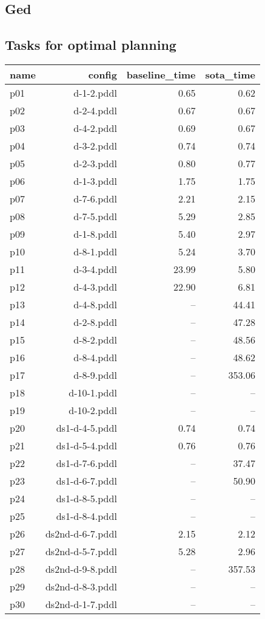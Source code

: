 \documentclass{article}
\begin{document}
                \newpage \subsection{Ged}
                    \subsection*{Tasks for optimal planning}
                    
                            \begin{center}
                            \scriptsize
                            \begin{tabular}{@{}l|r|r|r@{}}
                            name & config & baseline\_time & sota\_time\\\midrule
                              p01& d-1-2.pddl&0.65&0.62\\
  p02& d-2-4.pddl&0.67&0.67\\
  p03& d-4-2.pddl&0.69&0.67\\
  p04& d-3-2.pddl&0.74&0.74\\
  p05& d-2-3.pddl&0.80&0.77\\
  p06& d-1-3.pddl&1.75&1.75\\
  p07& d-7-6.pddl&2.21&2.15\\
  p08& d-7-5.pddl&5.29&2.85\\
  p09& d-1-8.pddl&5.40&2.97\\
  p10& d-8-1.pddl&5.24&3.70\\
  p11& d-3-4.pddl&23.99&5.80\\
  p12& d-4-3.pddl&22.90&6.81\\
  p13& d-4-8.pddl&--&44.41\\
  p14& d-2-8.pddl&--&47.28\\
  p15& d-8-2.pddl&--&48.56\\
  p16& d-8-4.pddl&--&48.62\\
  p17& d-8-9.pddl&--&353.06\\
  p18& d-10-1.pddl&--&--\\
  p19& d-10-2.pddl&--&--\\
  p20& ds1-d-4-5.pddl&0.74&0.74\\
  p21& ds1-d-5-4.pddl&0.76&0.76\\
  p22& ds1-d-7-6.pddl&--&37.47\\
  p23& ds1-d-6-7.pddl&--&50.90\\
  p24& ds1-d-8-5.pddl&--&--\\
  p25& ds1-d-8-4.pddl&--&--\\
  p26& ds2nd-d-6-7.pddl&2.15&2.12\\
  p27& ds2nd-d-5-7.pddl&5.28&2.96\\
  p28& ds2nd-d-9-8.pddl&--&357.53\\
  p29& ds2nd-d-8-3.pddl&--&--\\
  p30& ds2nd-d-1-7.pddl&--&--
                            \end{tabular}
                            \end{center}
                    
\end{document}
